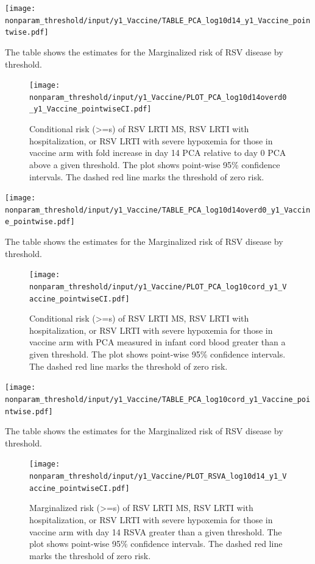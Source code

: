 \documentclass[11pt]{article}
\begin{document}
\begin{table}[H]
    \centering
    \texttt{[image: nonparam\_threshold/input/y1\_Vaccine/TABLE\_PCA\_log10d14\_y1\_Vaccine\_pointwise.pdf]}
    \caption{The table shows the  estimates for the Marginalized risk of RSV disease by threshold. }
\end{table}

\begin{figure}[H]
    \centering
    \texttt{[image: nonparam\_threshold/input/y1\_Vaccine/PLOT\_PCA\_log10d14overd0\_y1\_Vaccine\_pointwiseCI.pdf]}
    \caption{Conditional risk (>=s) of RSV LRTI MS, RSV LRTI with hospitalization, or RSV LRTI with severe hypoxemia for those in vaccine arm with fold increase in day 14 PCA relative to day 0 PCA above a given threshold. The plot shows point-wise 95\% confidence intervals. The dashed red line marks the threshold of zero risk.}
\end{figure}

\begin{table}[H]
    \centering
    \texttt{[image: nonparam\_threshold/input/y1\_Vaccine/TABLE\_PCA\_log10d14overd0\_y1\_Vaccine\_pointwise.pdf]}
    \caption{The table shows the  estimates for the Marginalized risk of RSV disease by threshold. }
\end{table}

\begin{figure}[H]
    \centering
    \texttt{[image: nonparam\_threshold/input/y1\_Vaccine/PLOT\_PCA\_log10cord\_y1\_Vaccine\_pointwiseCI.pdf]}
   \caption{Conditional risk (>=s) of RSV LRTI MS, RSV LRTI with hospitalization, or RSV LRTI with severe hypoxemia for those in vaccine arm with PCA measured in infant cord blood greater than a given threshold. The plot shows point-wise 95\% confidence intervals. The dashed red line marks the threshold of zero risk.}
\end{figure}

\begin{table}[H]
    \centering
    \texttt{[image: nonparam\_threshold/input/y1\_Vaccine/TABLE\_PCA\_log10cord\_y1\_Vaccine\_pointwise.pdf]}
    \caption{The table shows the  estimates for the Marginalized risk of RSV disease by threshold. }
\end{table}

\begin{figure}[H]
    \centering
    \texttt{[image: nonparam\_threshold/input/y1\_Vaccine/PLOT\_RSVA\_log10d14\_y1\_Vaccine\_pointwiseCI.pdf]}
   \caption{Marginalized risk (>=s) of RSV LRTI MS, RSV LRTI with hospitalization, or RSV LRTI with severe hypoxemia for those in vaccine arm with day 14 RSVA greater than a given threshold. The plot shows point-wise 95\% confidence intervals. The dashed red line marks the threshold of zero risk.}
      \label{tab:PLOT_RSVA_log10d14_y1_Vaccine_pointwiseCI.pdf}

\end{figure}
\end{document}
